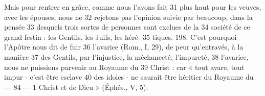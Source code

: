 Mais pour rentrer en grâce, comme nous l'avons fait	 
31	 	plus haut pour les veuves, avec les épouses, nous ne	 
32	 	rejetons pas l'opinion suivie par beaucoup, dans la pensée	 
33	 	desquels trois sortes de personnes sont exclues de la	 
34	 	société de ce grand festin : les Gentils, les Juifs, les héré-	 
35	 	tiques. 198. C'est pourquoi l'Apôtre nous dit de fuir	 
36	 	l'avarice (Rom., I, 29), de peur qu'entravés, à la manière	 
37	 	des Gentils, par l'injustice, la méchanceté, l'impureté,	 
38	 	l'avarice, nous ne puissions parvenir au Royaume du	 
39	 	Christ : car « tout avare, tout impur - c'est être esclave	 
40	 	des idoles - ne saurait être héritier du Royaume du	 
 	--- 84 ---	 
1	 	Christ et de Dieu » (Éphés., V, 5).